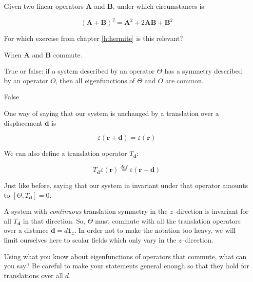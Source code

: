 \begin{exer}
Given two linear operators $\mathbf A$ and $\mathbf B$, under which circumstances is

$$\left ( {\mathbf A} + {\mathbf B} \right ) ^2 =  {\mathbf A}^2 + 2 {\mathbf A}{\mathbf B}  + {\mathbf B}^2$$

For which exercise from chapter \ref{h:hermite} is this relevant?
\begin{sol}
When $\mathbf A$ and $\mathbf B$ commute.
\end{sol}
\end{exer}

\begin{exer}
True or false: if a system described by an operator $\Theta$ has a symmetry described by an operator $O$, then all eigenfunctions of $\Theta$ and $O$ are common.
  \begin{sol}
    False
\end{sol}  
\end{exer}

\pagebreak


One way of saying that our system is unchanged by a translation over a displacement ${\mathbf d}$ is

\begin{equation}
\varepsilon ({\mathbf r} + {\mathbf d}) =  \varepsilon ({\mathbf r})
\end{equation} 

We can also define a translation operator $T_{\mathbf d}$:

\begin{equation}
T_{\mathbf d} \varepsilon ({\mathbf r}) \stackrel{def}{=} \varepsilon ({\mathbf r} + {\mathbf d})
\end{equation} 

Just like before, saying that our system in invariant under that operator amounts to $[\Theta, T_{\mathbf d}] = 0$.

A system with \emph{continuous} translation symmetry in the $z$--direction is invariant for all $T_{\mathbf d}$ in that direction. So, $\Theta$ must commute with all the translation operators over a distance ${\mathbf d} = d {\mathbf 1}_z$. In order not to make the notation too heavy, we will limit ourselves here to scalar fields which only vary in the $z$--direction.

\begin{cue}
  Using what you know about eigenfunctions of operators that commute, what can you say? Be careful to make your statements general enough so that they hold for translations over all ${d}$.
\end{cue}

